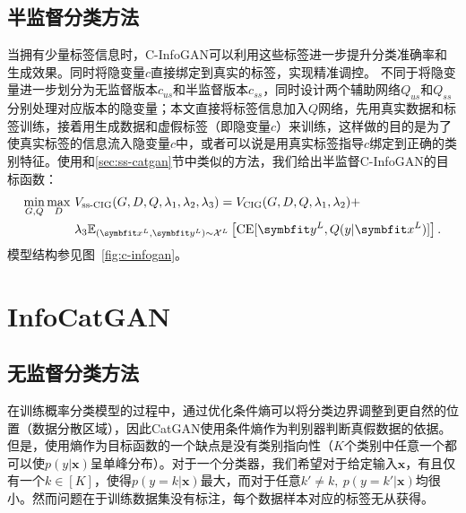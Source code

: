 \subsection{半监督分类方法}
当拥有少量标签信息时，C-InfoGAN可以利用这些标签进一步提升分类准确率和生成效果。同时将隐变量$c$直接绑定到真实的标签，实现精准调控。
不同于\citet{spurr2017guiding}将隐变量进一步划分为无监督版本$c_{us}$和半监督版本$c_{ss}$，同时设计两个辅助网络$Q_{us}$和$Q_{ss}$分别处理对应版本的隐变量；本文直接将标签信息加入$Q$网络，先用真实数据和标签训练，接着用生成数据和虚假标签（即隐变量$c$）来训练，这样做的目的是为了使真实标签的信息流入隐变量$c$中，或者可以说是用真实标签指导$c$绑定到正确的类别特征。使用和\ref{sec:ss-catgan}节中类似的方法，我们给出半监督C-InfoGAN的目标函数：
\begin{equation}
  \begin{split}
  \min_{G,Q}\max_D~ &V_{\text{ss-CIG}}(G,D,Q,\lambda_1,\lambda_2,\lambda_3) = 
  V_{\text{CIG}}(G,D,Q,\lambda_1,\lambda_2) + \\
  &\lambda_3 \E_{(\bd{x}^L, \bd{y}^L) \sim \mathcal{X}^L}
  \left[ \CE[\bd{y}^L, Q(y|\bd{x}^L)] \right].
  \end{split}
\end{equation}
模型结构参见图~\ref{fig:c-infogan}。


\section{InfoCatGAN}\label{sec:icg}
\subsection{无监督分类方法}\label{sec:icg-us}
在训练概率分类模型的过程中，通过优化条件熵可以将分类边界调整到更自然的位置（数据分散区域）\cite{grandvalet2005semi}，因此CatGAN使用条件熵作为判别器判断真假数据的依据。但是，使用熵作为目标函数的一个缺点是没有类别指向性（$K$个类别中任意一个都可以使$p(y|\mathbf{x})$呈单峰分布）。对于一个分类器，我们希望对于给定输入$\mathbf{x}$，有且仅有一个$k \in [K]$，使得$p(y=k|\mathbf{x})$最大，而对于任意$k' \neq k, ~p(y=k'|\mathbf{x})$均很小。然而问题在于训练数据集没有标注，每个数据样本对应的标签无从获得。

